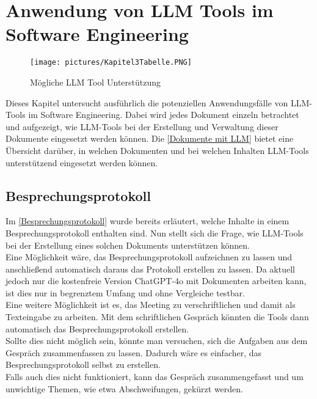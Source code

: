 \chapter{Anwendung von LLM Tools im Software Engineering} 

\begin{figure}
    \centering
    \texttt{[image: pictures/Kapitel3Tabelle.PNG]}
    \caption{Mögliche LLM Tool Unterstützung}
    \label{Dokumente mit LLM}
\end{figure}

Dieses Kapitel untersucht ausführlich die potenziellen Anwendungsfälle von LLM-Tools im Software Engineering. Dabei 
wird jedes Dokument einzeln betrachtet und aufgezeigt, wie LLM-Tools bei der Erstellung und Verwaltung dieser 
Dokumente eingesetzt werden können. Die \autoref{Dokumente mit LLM} bietet eine Übersicht darüber, in welchen 
Dokumenten und bei welchen Inhalten LLM-Tools unterstützend eingesetzt werden können.

\section{Besprechungsprotokoll}  \label{LLMBesprechungsprotokoll}

Im \autoref{Besprechungsprotokoll} wurde bereits erläutert, welche Inhalte in einem Besprechungsprotokoll enthalten 
sind. Nun stellt sich die Frage, wie LLM-Tools bei der Erstellung eines solchen Dokuments unterstützen können.\\

Eine Möglichkeit wäre, das Besprechungsprotokoll aufzeichnen zu lassen und anschließend automatisch daraus das Protokoll 
erstellen zu lassen. Da aktuell jedoch nur die kostenfreie Version ChatGPT-4o mit Dokumenten arbeiten kann, ist dies 
nur in begrenztem Umfang und ohne Vergleiche testbar.\\


Eine weitere Möglichkeit ist es, das Meeting zu verschriftlichen und damit als Texteingabe zu arbeiten. Mit dem 
schriftlichen Gespräch könnten die Tools dann automatisch das Besprechungsprotokoll erstellen.\\
Sollte dies nicht möglich sein, könnte man versuchen, sich die Aufgaben aus dem Gespräch zusammenfassen zu lassen.
Dadurch wäre es einfacher, das Besprechungsprotokoll selbst zu erstellen.\\
Falls auch dies nicht funktioniert, kann das Gespräch zusammengefasst und um unwichtige Themen, wie etwa Abschweifungen, 
gekürzt werden.

